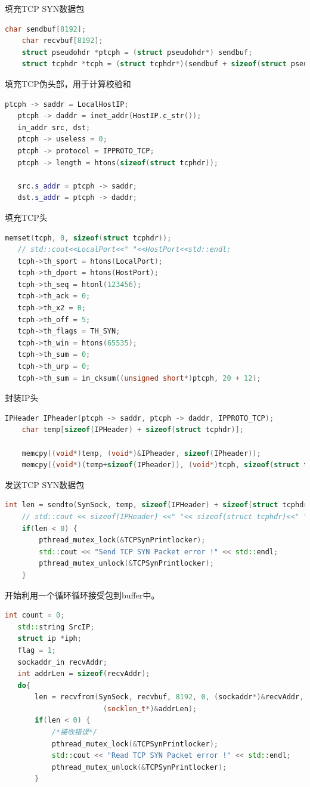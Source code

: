 \documentclass[UTF8,a4paper,10pt]{ctexart}
\begin{document}
填充TCP SYN数据包
\begin{lstlisting}[language = C++]
   char sendbuf[8192];
    char recvbuf[8192];
    struct pseudohdr *ptcph = (struct pseudohdr*) sendbuf;
    struct tcphdr *tcph = (struct tcphdr*)(sendbuf + sizeof(struct pseudohdr));
\end{lstlisting}
填充TCP伪头部，用于计算校验和
\begin{lstlisting}[language = C++]
   ptcph -> saddr = LocalHostIP;
   ptcph -> daddr = inet_addr(HostIP.c_str());
   in_addr src, dst;
   ptcph -> useless = 0;
   ptcph -> protocol = IPPROTO_TCP;
   ptcph -> length = htons(sizeof(struct tcphdr));
    
   src.s_addr = ptcph -> saddr;
   dst.s_addr = ptcph -> daddr;
\end{lstlisting}
填充TCP头
\begin{lstlisting}[language = C++]
   memset(tcph, 0, sizeof(struct tcphdr));
   // std::cout<<LocalPort<<" "<<HostPort<<std::endl;
   tcph->th_sport = htons(LocalPort);  
   tcph->th_dport = htons(HostPort); 
   tcph->th_seq = htonl(123456); 
   tcph->th_ack = 0; 
   tcph->th_x2 = 0; 
   tcph->th_off = 5; 
   tcph->th_flags = TH_SYN; 
   tcph->th_win = htons(65535); 
   tcph->th_sum = 0; 
   tcph->th_urp = 0; 
   tcph->th_sum = in_cksum((unsigned short*)ptcph, 20 + 12);
\end{lstlisting}
封装IP头
\begin{lstlisting}[language = C++]
   IPHeader IPheader(ptcph -> saddr, ptcph -> daddr, IPPROTO_TCP);
	char temp[sizeof(IPHeader) + sizeof(struct tcphdr)];

	memcpy((void*)temp, (void*)&IPheader, sizeof(IPheader));
	memcpy((void*)(temp+sizeof(IPheader)), (void*)tcph, sizeof(struct tcphdr));
\end{lstlisting}
发送TCP SYN数据包
\begin{lstlisting}[language = C++]
   int len = sendto(SynSock, temp, sizeof(IPHeader) + sizeof(struct tcphdr), 0, (struct sockaddr *)&SYNScanHostAddr, sizeof(SYNScanHostAddr));
    // std::cout << sizeof(IPHeader) <<" "<< sizeof(struct tcphdr)<<" "<<len << std::endl;
    if(len < 0) {
        pthread_mutex_lock(&TCPSynPrintlocker);
		std::cout << "Send TCP SYN Packet error !" << std::endl;
		pthread_mutex_unlock(&TCPSynPrintlocker);
    }
\end{lstlisting}
开始利用一个循环循环接受包到buffer中。
\begin{lstlisting}[language = C++]
   int count = 0;
   std::string SrcIP;
   struct ip *iph;
   flag = 1;
   sockaddr_in recvAddr;
   int addrLen = sizeof(recvAddr);
   do{
       len = recvfrom(SynSock, recvbuf, 8192, 0, (sockaddr*)&recvAddr,
                       (socklen_t*)&addrLen);
       if(len < 0) { 
           /*接收错误*/
           pthread_mutex_lock(&TCPSynPrintlocker);
           std::cout << "Read TCP SYN Packet error !" << std::endl;
           pthread_mutex_unlock(&TCPSynPrintlocker);
       }
\end{lstlisting}
\end{document}
